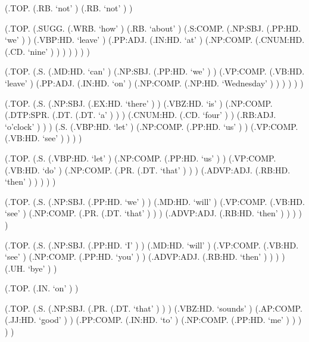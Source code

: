 \documentclass[10pt]{article}
\begin{document}
\begin{parsetree}  (.TOP. (.RB. `not' ) (.RB. `not' ) ) \end{parsetree}

\begin{parsetree}  (.TOP. (.SUGG. (.WRB. `how' ) (.RB. `about' ) (.S:COMP. (.NP:SBJ. (.PP:HD. `we' ) ) (.VBP:HD. `leave' ) (.PP:ADJ. (.IN:HD. `at' ) (.NP:COMP. (.CNUM:HD. (.CD. `nine' ) ) ) ) ) ) ) \end{parsetree}

\begin{parsetree}  (.TOP. (.S. (.MD:HD. `can' ) (.NP:SBJ. (.PP:HD. `we' ) ) (.VP:COMP. (.VB:HD. `leave' ) (.PP:ADJ. (.IN:HD. `on' ) (.NP:COMP. (.NP:HD. `Wednesday' ) ) ) ) ) ) \end{parsetree}

\begin{parsetree}  (.TOP. (.S. (.NP:SBJ. (.EX:HD. `there' ) ) (.VBZ:HD. `is' ) (.NP:COMP. (.DTP:SPR. (.DT. (.DT. `a' ) ) ) (.CNUM:HD. (.CD. `four' ) ) (.RB:ADJ. `o'clock' ) ) ) (.S. (.VBP:HD. `let' ) (.NP:COMP. (.PP:HD. `us' ) ) (.VP:COMP. (.VB:HD. `see' ) ) ) ) \end{parsetree}

\begin{parsetree}  (.TOP. (.S. (.VBP:HD. `let' ) (.NP:COMP. (.PP:HD. `us' ) ) (.VP:COMP. (.VB:HD. `do' ) (.NP:COMP. (.PR. (.DT. `that' ) ) ) (.ADVP:ADJ. (.RB:HD. `then' ) ) ) ) ) \end{parsetree}

\begin{parsetree}  (.TOP. (.S. (.NP:SBJ. (.PP:HD. `we' ) ) (.MD:HD. `will' ) (.VP:COMP. (.VB:HD. `see' ) (.NP:COMP. (.PR. (.DT. `that' ) ) ) (.ADVP:ADJ. (.RB:HD. `then' ) ) ) ) ) \end{parsetree}

\begin{parsetree}  (.TOP. (.S. (.NP:SBJ. (.PP:HD. `I' ) ) (.MD:HD. `will' ) (.VP:COMP. (.VB:HD. `see' ) (.NP:COMP. (.PP:HD. `you' ) ) (.ADVP:ADJ. (.RB:HD. `then' ) ) ) ) (.UH. `bye' ) ) \end{parsetree}

\begin{parsetree}  (.TOP. (.IN. `on' ) ) \end{parsetree}

\begin{parsetree}  (.TOP. (.S. (.NP:SBJ. (.PR. (.DT. `that' ) ) ) (.VBZ:HD. `sounds' ) (.AP:COMP. (.JJ:HD. `good' ) ) (.PP:COMP. (.IN:HD. `to' ) (.NP:COMP. (.PP:HD. `me' ) ) ) ) ) \end{parsetree}
\end{document}
